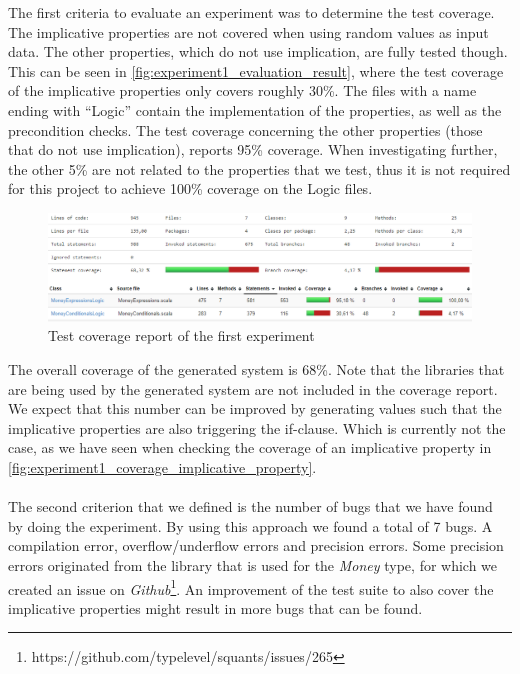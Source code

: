 The first criteria to evaluate an experiment was to determine the test
coverage. The implicative properties are not covered when using random
values as input data. The other properties, which do not use implication, are
fully tested though. This can be seen in
\autoref{fig:experiment1_evaluation_result}, where the test coverage of the
implicative properties only covers roughly 30\%. The files with a name
ending with ``Logic'' contain the implementation of the properties, as well as the
precondition checks. The test coverage concerning the other properties (those
that do not use implication), reports 95\% coverage. When investigating further,
the other 5\% are not related to the properties that we test, thus it is not
required for this project to achieve 100\% coverage on the Logic files.
\FloatBarrier
\begin{figure}[!ht]
	\includegraphics[width=\linewidth]{figures/eval_experiment1}
\caption{Test coverage report of the first experiment}
\label{fig:experiment1_evaluation_result}
\centering
\end{figure}
\FloatBarrier
The overall coverage of the generated system is 68\%. Note that the libraries
that are being used by the generated system are not included in the coverage
report. We expect that this number can be improved by generating values such
that the implicative properties are also triggering the if-clause. Which
is currently not the case, as we have seen when checking the coverage of an
implicative property in
\autoref{fig:experiment1_coverage_implicative_property}.\\
\\
The second criterion that we defined is the number of bugs that we have found
by doing the experiment. By using this approach we found a total of 7 bugs. A
compilation error, overflow/underflow errors and precision errors. Some
precision errors originated from the library that is used for the \textit{Money}
type, for which we created an issue on
\textit{Github}\footnote{https://github.com/typelevel/squants/issues/265}. An
improvement of the test suite to also cover the implicative properties might
result in more bugs that can be found.

